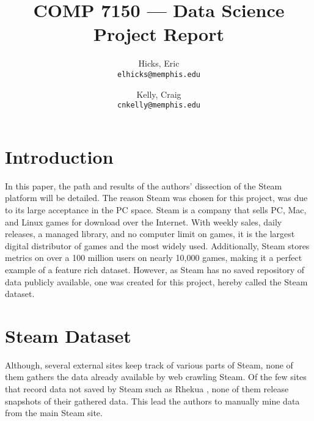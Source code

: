 \documentclass[letterpaper,10pt,twocolumn]{article}
\title{COMP 7150 --- Data Science Project Report}
\author{
    Hicks, Eric\\
    \texttt{elhicks@memphis.edu}
    \and
    Kelly, Craig\\
    \texttt{cnkelly@memphis.edu}
}
\begin{document}
\setlength{\pdfpageheight}{\paperheight}
\setlength{\pdfpagewidth}{\paperwidth}

\maketitle



\section{Introduction}

In this paper, the path and results of the authors' dissection of the Steam
platform will be detailed. The reason Steam was chosen for this project, was
due to its large acceptance in the PC space. Steam is a company that sells
PC, Mac, and Linux games for download over the Internet. With weekly sales,
daily releases, a managed library, and no computer limit on games, it is the
largest digital distributor of games and the most widely used. Additionally,
Steam stores metrics on over a 100 million users on nearly 10,000 games,
making it a perfect example of a feature rich dataset. However, as Steam has
no saved repository of data publicly available, one was created for this
project, hereby called the Steam dataset. \cite{steam}



\section{Steam Dataset}

Although, several external sites keep track of various parts of Steam, none of
them gathers the data already available by web crawling Steam. Of the few
sites that record data not saved by Steam such as Rhekua \cite{rhekua}, none
of them release snapshots of their gathered data. This lead the authors to
manually mine data from the main Steam site.
\end{document}
